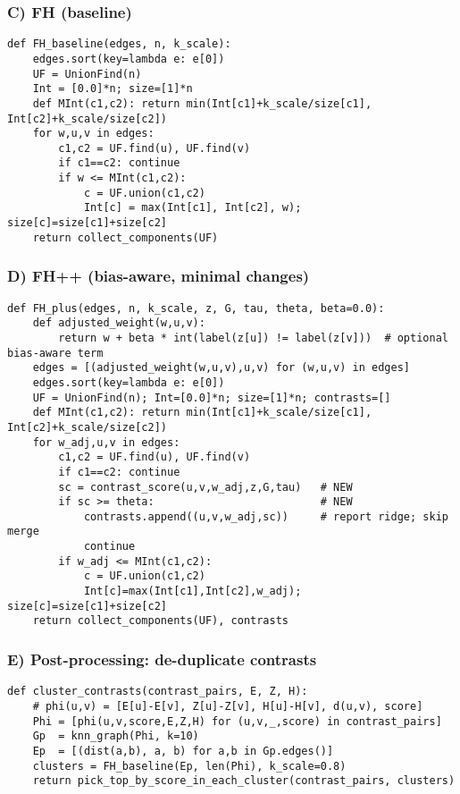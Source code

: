 \documentclass[11pt]{article}
\begin{document}
\subsubsection*{C) FH (baseline)}
\begin{lstlisting}[style=code]
def FH_baseline(edges, n, k_scale):
    edges.sort(key=lambda e: e[0])
    UF = UnionFind(n)
    Int = [0.0]*n; size=[1]*n
    def MInt(c1,c2): return min(Int[c1]+k_scale/size[c1], Int[c2]+k_scale/size[c2])
    for w,u,v in edges:
        c1,c2 = UF.find(u), UF.find(v)
        if c1==c2: continue
        if w <= MInt(c1,c2):
            c = UF.union(c1,c2)
            Int[c] = max(Int[c1], Int[c2], w); size[c]=size[c1]+size[c2]
    return collect_components(UF)
\end{lstlisting}

\subsubsection*{D) FH++ (bias-aware, minimal changes)}
\begin{lstlisting}[style=code]
def FH_plus(edges, n, k_scale, z, G, tau, theta, beta=0.0):
    def adjusted_weight(w,u,v):
        return w + beta * int(label(z[u]) != label(z[v]))  # optional bias-aware term
    edges = [(adjusted_weight(w,u,v),u,v) for (w,u,v) in edges]
    edges.sort(key=lambda e: e[0])
    UF = UnionFind(n); Int=[0.0]*n; size=[1]*n; contrasts=[]
    def MInt(c1,c2): return min(Int[c1]+k_scale/size[c1], Int[c2]+k_scale/size[c2])
    for w_adj,u,v in edges:
        c1,c2 = UF.find(u), UF.find(v)
        if c1==c2: continue
        sc = contrast_score(u,v,w_adj,z,G,tau)   # NEW
        if sc >= theta:                          # NEW
            contrasts.append((u,v,w_adj,sc))     # report ridge; skip merge
            continue
        if w_adj <= MInt(c1,c2):
            c = UF.union(c1,c2)
            Int[c]=max(Int[c1],Int[c2],w_adj); size[c]=size[c1]+size[c2]
    return collect_components(UF), contrasts
\end{lstlisting}

\subsubsection*{E) Post-processing: de-duplicate contrasts}
\begin{lstlisting}[style=code]
def cluster_contrasts(contrast_pairs, E, Z, H):
    # phi(u,v) = [E[u]-E[v], Z[u]-Z[v], H[u]-H[v], d(u,v), score]
    Phi = [phi(u,v,score,E,Z,H) for (u,v,_,score) in contrast_pairs]
    Gp  = knn_graph(Phi, k=10)
    Ep  = [(dist(a,b), a, b) for a,b in Gp.edges()]
    clusters = FH_baseline(Ep, len(Phi), k_scale=0.8)
    return pick_top_by_score_in_each_cluster(contrast_pairs, clusters)
\end{lstlisting}
\end{document}
